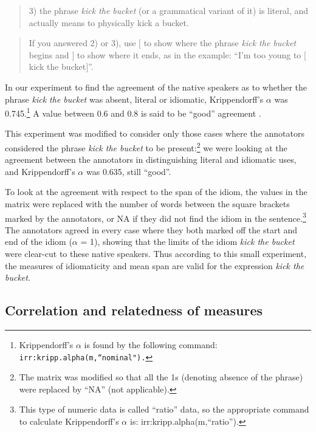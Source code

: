 \documentclass[output=paper]{langsci/langscibook}
\begin{document}
\begin{quotation}
3) the phrase \textit{kick the bucket} (or a grammatical variant of it) is
literal, and actually means to physically kick a bucket.
\end{quotation}

\begin{quotation}
If you answered 2) or 3), use $[$ to show where the phrase \textit{kick the bucket} begins and $]$ to show where it ends, as in the example: ``I'm too
young to $[$kick the bucket$]$”.
\end{quotation}


In our experiment to find the agreement of the native speakers as to
whether the phrase \textit{kick the bucket} was absent, literal or idiomatic,
Krippendorff’s $\alpha$ was 0.745.\footnote{Krippendorff’s $\alpha$ is found
by the following command: \texttt{irr:kripp.alpha(m,``nominal").}}  A value
between 0.6 and 0.8 is said to be “good” agreement \citep[404]{altmann1991}.



This experiment was modified to consider only those cases where the
annotators considered the phrase \textit{kick the bucket} to be
present:\footnote{The matrix was modified so that all the 1s (denoting
absence of the phrase) were replaced by “NA” (not applicable).} we were
looking at the agreement between the annotators in distinguishing
literal and idiomatic uses, and Krippendorff’s $\alpha$ was 0.635, still
“good”.



To look at the agreement with respect to the span of the idiom, the
values in the matrix were replaced with the number of words between the
square brackets marked by the annotators, or NA if they did not find
the idiom in the sentence.\footnote{This type of numeric data is called
“ratio” data, so the appropriate command to calculate Krippendorff’s
$\alpha$ is: irr:kripp.alpha(m,``ratio”).} The annotators agreed in every
case where they both marked off the start and end of the idiom ($\alpha$ =
1), showing that the limits of the idiom \textit{kick the bucket} were
clear-cut to these native speakers. Thus according to this small
experiment, the measures of idiomaticity and mean span are valid for
the expression \textit{kick the bucket}. 



\subsection{Correlation and relatedness of measures}
\end{document}
